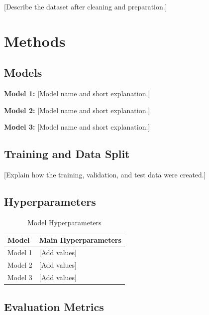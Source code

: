 \documentclass[conference]{IEEEtran}
\begin{document}
[Describe the dataset after cleaning and preparation.]


\section{Methods}


\subsection{Models}


\textbf{Model 1:} [Model name and short explanation.]

\textbf{Model 2:} [Model name and short explanation.]

\textbf{Model 3:} [Model name and short explanation.]


\subsection{Training and Data Split}

[Explain how the training, validation, and test data were created.]


\subsection{Hyperparameters}


\begin{table}[ht]
\centering
\caption{Model Hyperparameters}
\begin{tabular}{ll}
\toprule
Model & Main Hyperparameters \\
\midrule
Model 1 & [Add values] \\
Model 2 & [Add values] \\
Model 3 & [Add values] \\
\bottomrule
\end{tabular}
\end{table}

\subsection{Evaluation Metrics}
\end{document}
